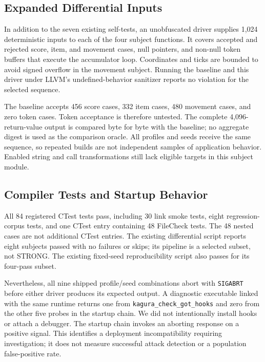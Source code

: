 \documentclass[conference]{IEEEtran}
\begin{document}
\subsection{Expanded Differential Inputs}

In addition to the seven existing self-tests, an unobfuscated driver supplies
1,024 deterministic inputs to each of the four subject functions. It covers
accepted and rejected score, item, and movement cases, null pointers,
and non-null token buffers that execute the accumulator loop.
Coordinates and ticks are bounded to avoid signed overflow in the movement
subject. Running the baseline and this driver under LLVM's undefined-behavior
sanitizer reports no violation for the selected sequence.

The baseline accepts 456 score cases, 332 item cases, 480 movement cases,
and zero token cases. Token acceptance is therefore untested. The complete
4,096-return-value output is compared byte for byte with the baseline;
no aggregate digest is used as the comparison oracle. All profiles and seeds
receive the same sequence, so repeated builds are not independent samples
of application behavior. Enabled string and call transformations still lack
eligible targets in this subject module.

\subsection{Compiler Tests and Startup Behavior}

All 84 registered CTest tests pass, including 30 link smoke tests, eight
regression-corpus tests, and one CTest entry containing 48 FileCheck tests.
The 48 nested cases are not additional CTest entries. The existing
differential script reports eight subjects passed with no failures or skips;
its pipeline is a selected subset, not STRONG. The existing fixed-seed
reproducibility script also passes for its four-pass subset.

Nevertheless, all nine shipped profile/seed combinations abort with
\texttt{SIGABRT} before either driver produces its expected output.
A diagnostic executable linked with the same runtime returns one from
\texttt{kagura\_check\_got\_hooks} and zero from the other five probes in
the startup chain. We did not intentionally install hooks or attach a
debugger. The startup chain invokes an aborting response on a positive
signal. This identifies a deployment incompatibility requiring investigation;
it does not measure successful attack detection or a population
false-positive rate.
\end{document}
